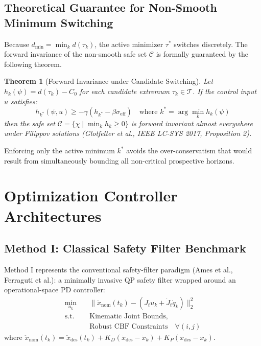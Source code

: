 \documentclass[10pt,twocolumn,a4paper]{article}
\newtheorem{theorem}{Theorem}
\begin{document}
\subsection{Theoretical Guarantee for Non-Smooth Minimum Switching}
Because $d_{\min} = \min_{k} d(\tau_k)$, the active minimizer $\tau^*$ switches discretely. The forward invariance of the non-smooth safe set $\mathcal{C}$ is formally guaranteed by the following theorem.

\begin{theorem}[Forward Invariance under Candidate Switching]
Let $h_k(\psi) = d(\tau_k) - C_0$ for each candidate extremum $\tau_k \in \mathcal{T}$. If the control input $u$ satisfies:
\begin{equation}
\dot{h}_{k^*}(\psi, u) \ge -\gamma (h_{k^*} - \beta \sigma_{\text{eff}}) \quad \text{where } k^* = \arg\min_k h_k(\psi)
\end{equation}
then the safe set $\mathcal{C} = \{\chi \mid \min_k h_k \ge 0\}$ is forward invariant almost everywhere under Filippov solutions (Glotfelter et al., IEEE LC-SYS 2017, Proposition 2).
\end{theorem}

Enforcing only the active minimum $k^*$ avoids the over-conservatism that would result from simultaneously bounding all non-critical prospective horizons.

\section{Optimization Controller Architectures}

\subsection{Method I: Classical Safety Filter Benchmark}
Method I represents the conventional safety-filter paradigm (Ames et al., Ferraguti et al.): a minimally invasive QP safety filter wrapped around an operational-space PD controller:
\begin{align}
\min_{u_k} \quad & \|\ddot{x}_{\text{nom}}(t_k) - (J_t u_k + \dot{J}_t \dot{q}_k)\|_2^2 \\
\text{s.t.} \quad & \text{Kinematic Joint Bounds}, \nonumber\\
& \text{Robust CBF Constraints} \quad \forall (i, j) \nonumber
\end{align}
where $\ddot{x}_{\text{nom}}(t_k) = \ddot{x}_{\text{des}}(t_k) + K_D(\dot{x}_{\text{des}} - \dot{x}_k) + K_P(x_{\text{des}} - x_k)$.
\end{document}
